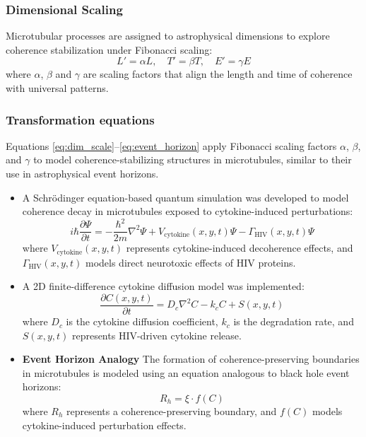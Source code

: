 \documentclass[entropy,article,submit,oneauthor,pdftex]{Definitions/mdpi}
\begin{document}
\subsubsection{Dimensional Scaling}
Microtubular processes are assigned to astrophysical dimensions to explore coherence stabilization under Fibonacci scaling: 
\begin{equation}
    L' = \alpha L, \quad T' = \beta T, \quad E' = \gamma E
\label{eq:dim_scale} 
\end{equation} 
where $\alpha$, $\beta$ and $\gamma$ are scaling factors that align the length and time of coherence with universal patterns.

\subsubsection{Transformation equations} 
Equations \ref{eq:dim_scale}--\ref{eq:event_horizon} apply Fibonacci scaling factors $\alpha$, $\beta$, and $\gamma$ to model coherence-stabilizing structures in microtubules, similar to their use in astrophysical event horizons.

\begin{itemize}
\item A Schrödinger equation-based quantum simulation was developed to model coherence decay in microtubules exposed to cytokine-induced perturbations:
\begin{equation}
    i\hbar \frac{\partial \Psi}{\partial t} = -\frac{\hbar^2}{2m} \nabla^2 \Psi + V_{\text{cytokine}}(x, y, t) \Psi - \Gamma_{\text{HIV}}(x, y, t) \Psi
\end{equation}
where \( V_{\text{cytokine}}(x, y, t) \) represents cytokine-induced decoherence effects, and \( \Gamma_{\text{HIV}}(x, y, t) \) models direct neurotoxic effects of HIV proteins.

\item A 2D finite-difference cytokine diffusion model was implemented:
\begin{equation}
    \frac{\partial C(x, y, t)}{\partial t} = D_c \nabla^2 C - k_c C + S(x, y, t)
\end{equation}
where \( D_c \) is the cytokine diffusion coefficient, \( k_c \) is the degradation rate, and \( S(x, y, t) \) represents HIV-driven cytokine release.

\item \textbf{Event Horizon Analogy} The formation of coherence-preserving boundaries in microtubules is modeled using an equation analogous to black hole event horizons:
\begin{equation}
    R_h = \xi \cdot f(C)
    \label{eq:event_horizon}
\end{equation}
where $R_h$ represents a coherence-preserving boundary, and $f(C)$ models cytokine-induced perturbation effects.
\end{itemize}
\end{document}
